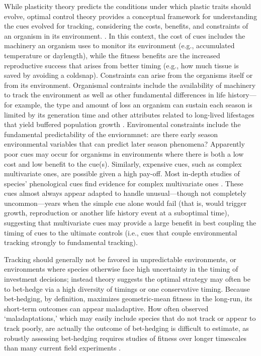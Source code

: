 \documentclass[11pt,letterpaper]{article}
\newcommand{\R}[1]{\label{#1}\linelabel{#1}}
\begin{document}
While plasticity theory predicts the conditions under which plastic traits should evolve, optimal control theory provides a conceptual framework for understanding the cues evolved for tracking, considering the costs, benefits, and constraints of an organism in its environment. \citep{donahue2015}. In this context, the cost of cues includes the machinery an organism uses to monitor its environment (e.g., accumulated temperature or daylength), while the fitness benefits are the increased reproductive success that arises from better timing (e.g., how much tissue is saved by avoiding a coldsnap).  Constraints can arise from the organisms itself or from its environment.  Organismal contraints include the availability of machinery to track the environment as well as other fundamental differences in life history---for example, the type and amount of loss an organism can sustain each season is limited by its generation time and other attributes related to long-lived lifestages that yield buffered population growth \citep{Chesson:1997dz}.  Enviromental constraints include the fundamental predictability of the enviornmnet:  are there early season environmental variables that can predict later season phenomena?  Apparently poor cues may occur for organisms in environments where there is both a low cost and low benefit to the cue(s). Similarly, expensive cues, such as complex multivariate ones, are possible given a high pay-off. Most in-depth studies of species' phenological cues find evidence for complex multivariate ones \citep{chuinearees}. These cues almost always appear adapted to handle unusual---though not completely uncommon---years when the simple cue alone would fail (that is, would trigger growth, reproduction or another life history event at a suboptimal time), suggesting that multivariate cues may provide a large benefit in best coupling the timing of cues to the ultimate controls (i.e., cues that couple environmental tracking strongly to fundamental tracking). \R{plasE}

\R{bhS}Tracking should generally not be favored in unpredictable environments, or environments where species otherwise face high uncertainty in the timing of investment decisions; instead theory suggests the optimal strategy may often be to bet-hedge \citep{Venable:2007os,donald2013,decasas2015}\R{r1ass4} via a high diversity of timings or one conservative timing. Because bet-hedging, by definition, maximizes geometric-mean fitness in the long-run, its short-term outcomes can appear maladaptive. How often observed `maladaptations,' which may easily include species that do not track or appear to track poorly, are actually the outcome of bet-hedging is difficult to estimate, as robustly assessing bet-hedging requires studies of fitness over longer timescales than many current field experiments \citep{simons2011}.\R{simonsref1}
\end{document}
